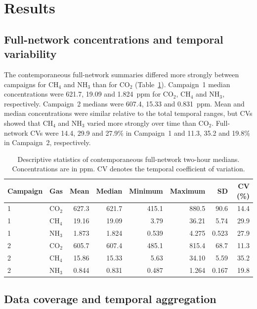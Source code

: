 \documentclass[12pt,a4paper]{article}
\begin{document}
\section{Results}

\subsection{Full-network concentrations and temporal variability}

The contemporaneous full-network summaries differed more strongly between campaigns for \(\mathrm{CH_4}\) and \(\mathrm{NH_3}\) than for \(\mathrm{CO_2}\) (Table~\ref{tab:full-network}). Campaign~1 median concentrations were 621.7, 19.09 and \SI{1.824}{ppm} for \(\mathrm{CO_2}\), \(\mathrm{CH_4}\) and \(\mathrm{NH_3}\), respectively. Campaign~2 medians were 607.4, 15.33 and \SI{0.831}{ppm}. Mean and median concentrations were similar relative to the total temporal ranges, but CVs showed that \(\mathrm{CH_4}\) and \(\mathrm{NH_3}\) varied more strongly over time than \(\mathrm{CO_2}\). Full-network CVs were 14.4, 29.9 and 27.9\% in Campaign~1 and 11.3, 35.2 and 19.8\% in Campaign~2, respectively.

\begin{table}[htbp]
\centering
\caption{Descriptive statistics of contemporaneous full-network two-hour medians. Concentrations are in ppm. CV denotes the temporal coefficient of variation.}
\label{tab:full-network}
\small
\begin{tabular}{llrrrrrr}
\toprule
Campaign & Gas & Mean & Median & Minimum & Maximum & SD & CV (\%)\\
\midrule
1 & \(\mathrm{CO_2}\) & 627.3 & 621.7 & 415.1 & 880.5 & 90.6 & 14.4\\
1 & \(\mathrm{CH_4}\) & 19.16 & 19.09 & 3.79 & 36.21 & 5.74 & 29.9\\
1 & \(\mathrm{NH_3}\) & 1.873 & 1.824 & 0.539 & 4.275 & 0.523 & 27.9\\
2 & \(\mathrm{CO_2}\) & 605.7 & 607.4 & 485.1 & 815.4 & 68.7 & 11.3\\
2 & \(\mathrm{CH_4}\) & 15.86 & 15.33 & 5.63 & 34.10 & 5.59 & 35.2\\
2 & \(\mathrm{NH_3}\) & 0.844 & 0.831 & 0.487 & 1.264 & 0.167 & 19.8\\
\bottomrule
\end{tabular}
\end{table}

\iffalse

\subsection{Data coverage and temporal aggregation}
\end{document}
